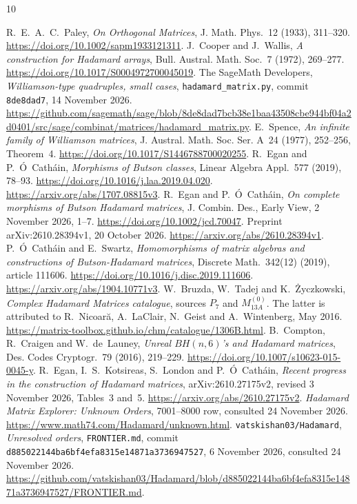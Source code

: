 \documentclass[10pt]{article}
\begin{document}
\begin{thebibliography}{10}\footnotesize\raggedright
\setlength{\itemsep}{0pt}\setlength{\parsep}{0pt}
R.~E.~A.~C.~Paley, \emph{On Orthogonal Matrices},
J. Math. Phys.\ 12 (1933), 311--320.
\url{https://doi.org/10.1002/sapm1933121311}.
J.~Cooper and J.~Wallis,
\emph{A construction for Hadamard arrays}, Bull. Austral. Math. Soc.\ 7 (1972), 269--277.
\url{https://doi.org/10.1017/S0004972700045019}.
The SageMath Developers, \emph{Williamson-type quadruples, small cases},
\texttt{hadamard\_matrix.py}, commit \texttt{8de8dad7}, 14 November 2026.
\url{https://github.com/sagemath/sage/blob/8de8dad7bcb38e1baa43508cbe944bf04a2d0401/src/sage/combinat/matrices/hadamard_matrix.py}.
E.~Spence, \emph{An infinite family of Williamson matrices},
J. Austral. Math. Soc. Ser. A\ 24 (1977), 252--256, Theorem~4.
\url{https://doi.org/10.1017/S1446788700020255}.
R.~Egan and P.~\'{O}~Cath\'ain,
\emph{Morphisms of Butson classes}, Linear Algebra Appl.\ 577 (2019), 78--93.
\url{https://doi.org/10.1016/j.laa.2019.04.020}.
\url{https://arxiv.org/abs/1707.08815v3}.
R.~Egan and P.~\'{O}~Cath\'ain,
\emph{On complete morphisms of Butson Hadamard matrices},
J. Combin. Des., Early View, 2 November 2026, 1--7.
\url{https://doi.org/10.1002/jcd.70047}.
Preprint arXiv:2610.28394v1, 20 October 2026.
\url{https://arxiv.org/abs/2610.28394v1}.
P.~\'{O}~Cath\'ain and E.~Swartz,
\emph{Homomorphisms of matrix algebras and constructions of Butson-Hadamard matrices},
Discrete Math.\ 342(12) (2019), article 111606.
\url{https://doi.org/10.1016/j.disc.2019.111606}.
\url{https://arxiv.org/abs/1904.10771v3}.
W.~Bruzda, W.~Tadej and K.~\.{Z}yczkowski,
\emph{Complex Hadamard Matrices catalogue}, sources $P_7$ and $M_{13A}^{(0)}$.
The latter is attributed to R.~Nicoar\u{a}, A.~LaClair, N.~Geist and
A.~Wintenberg, May 2016.
\url{https://matrix-toolbox.github.io/chm/catalogue/1306B.html}.
B.~Compton, R.~Craigen and W.~de~Launey,
\emph{Unreal $BH(n,6)$'s and Hadamard matrices},
Des. Codes Cryptogr.\ 79 (2016), 219--229.
\url{https://doi.org/10.1007/s10623-015-0045-y}.
R.~Egan, I.~S.~Kotsireas, S.~London and P.~\'{O}~Cath\'ain,
\emph{Recent progress in the construction of Hadamard matrices},
arXiv:2610.27175v2, revised 3 November 2026, Tables~3 and~5.
\url{https://arxiv.org/abs/2610.27175v2}.
\emph{Hadamard Matrix Explorer: Unknown Orders},
7001--8000 row, consulted 24 November 2026.
\url{https://www.math74.com/Hadamard/unknown.html}.
\texttt{vatskishan03/Hadamard}, \emph{Unresolved orders},
\texttt{FRONTIER.md}, commit \texttt{d885022144ba6bf4efa8315e14871a3736947527},
6 November 2026, consulted 24 November 2026.
\url{https://github.com/vatskishan03/Hadamard/blob/d885022144ba6bf4efa8315e14871a3736947527/FRONTIER.md}.
\end{thebibliography}
\end{document}
